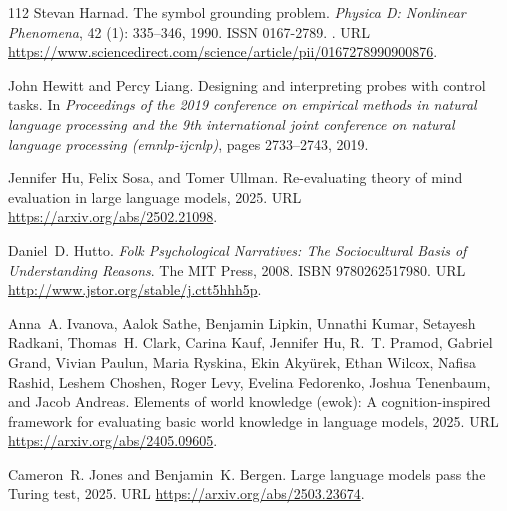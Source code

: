 \begin{thebibliography}{112}
Stevan Harnad.
\newblock The symbol grounding problem.
\newblock \emph{Physica D: Nonlinear Phenomena}, 42 (1): 335--346, 1990.
\newblock ISSN 0167-2789.
\newblock {}.
\newblock URL \url{https://www.sciencedirect.com/science/article/pii/0167278990900876}.

John Hewitt and Percy Liang.
\newblock Designing and interpreting probes with control tasks.
\newblock In \emph{Proceedings of the 2019 conference on empirical methods in natural language processing and the 9th international joint conference on natural language processing (emnlp-ijcnlp)}, pages 2733--2743, 2019.

Jennifer Hu, Felix Sosa, and Tomer Ullman.
\newblock Re-evaluating theory of mind evaluation in large language models, 2025.
\newblock URL \url{https://arxiv.org/abs/2502.21098}.

Daniel~D. Hutto.
\newblock \emph{Folk Psychological Narratives: The Sociocultural Basis of Understanding Reasons}.
\newblock The MIT Press, 2008.
\newblock ISBN 9780262517980.
\newblock URL \url{http://www.jstor.org/stable/j.ctt5hhh5p}.

Anna~A. Ivanova, Aalok Sathe, Benjamin Lipkin, Unnathi Kumar, Setayesh Radkani, Thomas~H. Clark, Carina Kauf, Jennifer Hu, R.~T. Pramod, Gabriel Grand, Vivian Paulun, Maria Ryskina, Ekin Akyürek, Ethan Wilcox, Nafisa Rashid, Leshem Choshen, Roger Levy, Evelina Fedorenko, Joshua Tenenbaum, and Jacob Andreas.
\newblock Elements of world knowledge (ewok): A cognition-inspired framework for evaluating basic world knowledge in language models, 2025.
\newblock URL \url{https://arxiv.org/abs/2405.09605}.

Cameron~R. Jones and Benjamin~K. Bergen.
\newblock Large language models pass the {Turing} test, 2025.
\newblock URL \url{https://arxiv.org/abs/2503.23674}.


\end{thebibliography}
